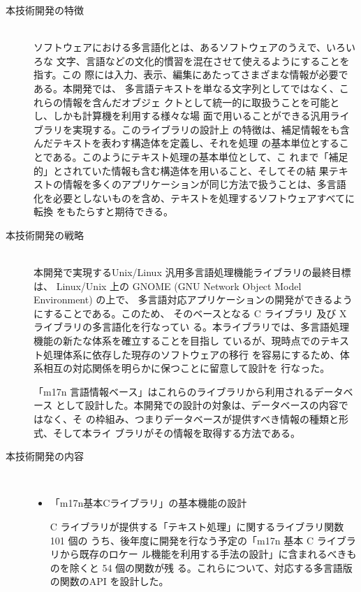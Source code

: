 \begin{description}

\item[本技術開発の特徴]~\\ 
ソフトウェアにおける多言語化とは、あるソフトウェアのうえで、いろいろな
文字、言語などの文化的慣習を混在させて使えるようにすることを指す。この
際には入力、表示、編集にあたってさまざまな情報が必要である。本開発では、
多言語テキストを単なる文字列としてではなく、これらの情報を含んだオブジェ
クトとして統一的に取扱うことを可能とし、しかも計算機を利用する様々な場
面で用いることができる汎用ライブラリを実現する。このライブラリの設計上
の特徴は、補足情報をも含んだテキストを表わす構造体を定義し、それを処理
の基本単位とすることである。このようにテキスト処理の基本単位として、こ
れまで「補足的」とされていた情報も含む構造体を用いること、そしてその結
果テキストの情報を多くのアプリケーションが同じ方法で扱うことは、多言語
化を必要としないものを含め、テキストを処理するソフトウェアすべてに転換
をもたらすと期待できる。

\item[本技術開発の戦略]~\\ 
本開発で実現するUnix/Linux 汎用多言語処理機能ライブラリの最終目標は、 
Linux/Unix 上の GNOME (GNU Network Object Model Environment) の上で、
多言語対応アプリケーションの開発ができるようにすることである。このため、
そのベースとなる C ライブラリ 及び X ライブラリの多言語化を行なってい
る。本ライブラリでは、多言語処理機能の新たな体系を確立することを目指し
ているが、現時点でのテキスト処理体系に依存した現存のソフトウェアの移行
を容易にするため、体系相互の対応関係を明らかに保つことに留意して設計を
行なった。

「m17n 言語情報ベース」はこれらのライブラリから利用されるデータベース
として設計した。本開発での設計の対象は、データベースの内容ではなく、そ
の枠組み、つまりデータベースが提供すべき情報の種類と形式、そして本ライ
ブラリがその情報を取得する方法である。

\item[本技術開発の内容]~\\
\begin{itemize}
\item 「m17n基本Cライブラリ」の基本機能の設計

C ライブラリが提供する「テキスト処理」に関するライブラリ関数 101 個の
うち、後年度に開発を行なう予定の「m17n 基本 C ライブラリから既存のロケー
ル機能を利用する手法の設計」に含まれるべきものを除くと 54 個の関数が残
る。これらについて、対応する多言語版の関数のAPI を設計した。


\end{itemize}
\end{description}
